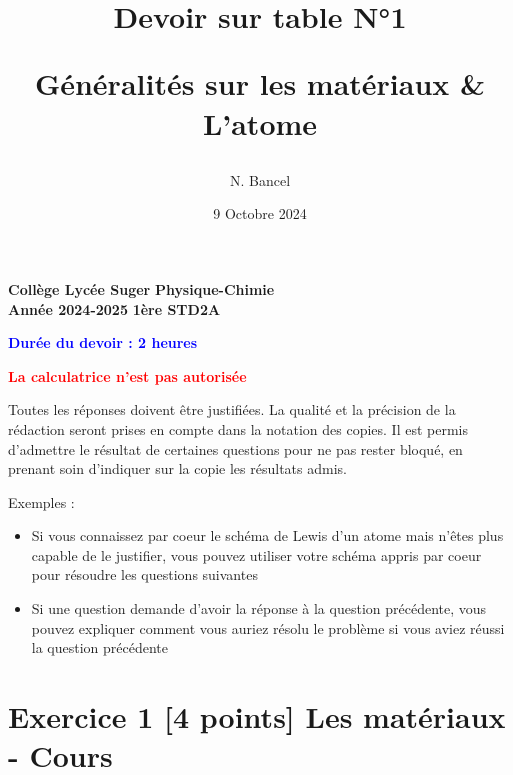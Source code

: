 \documentclass{exam}
\title{Devoir sur table N°1 \par 
Généralités sur les matériaux \& L'atome}
\author{N. Bancel}
\date{9 Octobre 2024}
\begin{document}
\textbf{Collège Lycée Suger}
\hfill
\textbf{Physique-Chimie} \\

\textbf{Année 2024-2025}
\hfill
\textbf{1ère STD2A} \par

{\let\newpage\relax\maketitle}

\begin{center}
  \textbf{\textcolor{blue}{Durée du devoir : 2 heures}} \par
  \vspace{1em}
  \textbf{\textcolor{red}{La calculatrice n'est pas autorisée}}
\end{center}

\begin{tcolorbox}[colback=gray!10!white, colframe=gray, title=Note importante]
  \itshape{Toutes les réponses doivent être justifiées.
  La qualité et la précision de la rédaction seront prises en compte dans la notation des copies.
  Il est permis d'admettre le résultat de certaines questions pour ne pas rester bloqué, en prenant soin d'indiquer sur la copie les résultats admis. \par
  \vspace{1em}
  Exemples :
  \begin{itemize}
    \item Si vous connaissez par coeur le schéma de Lewis d'un atome mais n'êtes plus capable de le justifier, vous pouvez utiliser votre schéma appris par coeur pour résoudre les questions suivantes 
    \item Si une question demande d'avoir la réponse à la question précédente, vous pouvez expliquer comment vous auriez résolu le problème si vous aviez réussi la question précédente
  \end{itemize}
  }
\end{tcolorbox}

\section*{Exercice 1 [4 points] Les matériaux - Cours}
\end{document}
